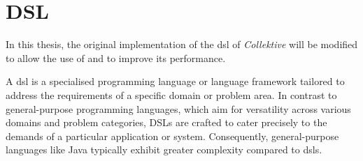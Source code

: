 \section{DSL}
\label{sec:dsl}

In this thesis, the original implementation of the \ac{dsl} of \emph{Collektive} will be modified to allow the use of \xc{}
and to improve its performance.

A \ac{dsl} is a specialised programming language or language framework tailored to address the
requirements of a specific domain or problem area.
In contrast to general-purpose programming languages, which aim for versatility across various domains and problem categories,
DSLs are crafted to cater precisely to the demands of a particular application or system.
Consequently, general-purpose languages like Java typically exhibit greater complexity compared to \acp{dsl}.


